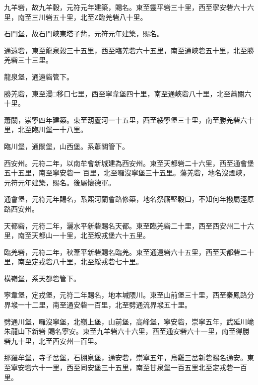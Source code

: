 \begin{pinyinscope}
 九羊砦，故九羊穀，元符元年建築，賜名。東至靈平砦三十里，西至寧安砦六十六里，南至三川砦五十里，北至Z臨羌砦八十里。



 石門堡，故石門峽東塔子觜，元符元年建築，賜名。



 通遠砦，東至龍泉穀三十五里，西至臨羌砦六十五里，南至通峽砦五十里，北至勝羌砦三十三里。



 龍泉堡，通遠砦管下。



 勝羌砦，東至漫□移口七里，西至寧韋堡四十里，南至通峽砦八十里，北至蕭關六十里。



 蕭關，崇寧四年建築。東至葫蘆河一十五里，西至綏寧堡三十里，南至勝羌砦六十里，北至臨川堡一十八里。



 臨川堡，通關堡，山西堡。系蕭關管下。



 西安州。元符二年，以南牟會新城建為西安州。東至天都砦二十六里，西至通會堡五十五里，南至寧安砦一
 百里，北至囉沒寧堡三十五里。蕩羌砦，地名沒煙峽，元符元年建築，賜名。後屬懷德軍。



 通會堡，元符元年賜名，系熙河蘭會路修築，地名祭廝堅穀口，不知何年撥屬涇原路西安州。



 天都砦，元符二年，灑水平新砦賜名天都。東至臨羌砦二十里，西至西安州二十六里，南至天都山一十里，北至綏戎堡六十五里。



 臨羌砦，元符二年，秋葦平新砦賜名臨羌。東至通遠砦六十五里，西至天都砦二十里，南至定戎砦八十里，北至綏戎砦七十里。



 橫嶺堡，系天都砦管下。



 寧韋堡，定戎堡，元符二年賜名，地本堿隈川。東至山前堡三十里，西至秦鳳路分界堠一十二里，南至通安砦一百里，北至劈通流界堠五十里。



 劈通川堡，囉沒寧堡，北嶺上堡，山前堡，高峰堡，寧安砦，崇寧五年，武延川峗朱龍山下新砦
 賜名寧安。東至九羊砦六十六里，西至通安砦六十一里，南至得勝砦九十里，北至西安州一百里。



 那羅牟堡，寺子岔堡，石棚泉堡，通安砦，崇寧五年，烏雞三岔新砦賜名通安。東至寧安砦六十一里，西至同安堡三十五里，南至甘泉堡一百五里北至定戎砦一百里。




\end{pinyinscope}

